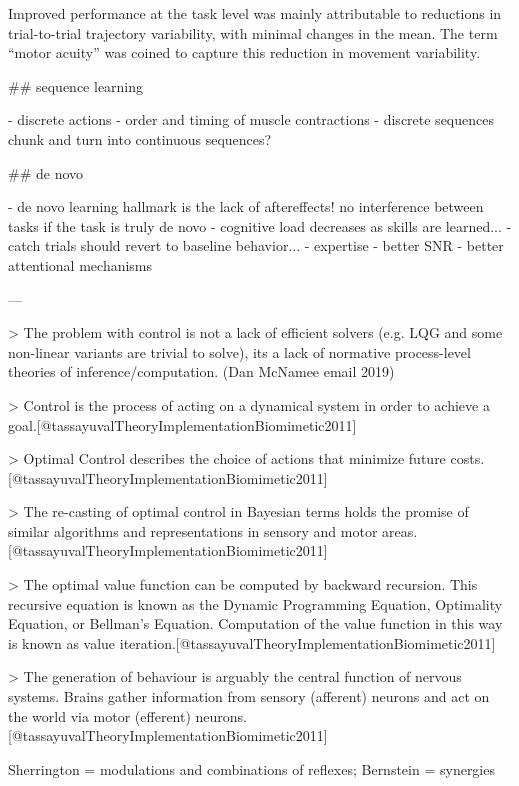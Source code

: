 \documentclass[../main.tex]{subfiles}
\begin{document}
{{Improved performance at the task level was mainly attributable to reductions in trial-to-trial trajectory variability, with minimal changes in the mean. The term “motor acuity” was coined to capture this reduction in movement variability.

## sequence learning

- discrete actions
- order and timing of muscle contractions
- discrete sequences chunk and turn into continuous sequences?

## de novo

- de novo learning hallmark is the lack of aftereffects! no interference between tasks if the task is truly de novo
- cognitive load decreases as skills are learned...
- catch trials should revert to baseline behavior...
- expertise
	- better SNR
	- better attentional mechanisms

---


> The problem with control is not a lack of efficient solvers (e.g. LQG and some non-linear variants are trivial to solve), its a lack of normative process-level theories of inference/computation. (Dan McNamee email 2019)

> Control is the process of acting on a dynamical system in order to achieve a goal.[@tassayuvalTheoryImplementationBiomimetic2011]


> Optimal Control describes the choice of actions that minimize future costs.[@tassayuvalTheoryImplementationBiomimetic2011]



> The re-casting  of  optimal  control  in  Bayesian  terms  holds  the  promise  of  similar algorithms and representations in sensory and motor areas.[@tassayuvalTheoryImplementationBiomimetic2011]



> The optimal value function can be computed by backward recursion. This recursive equation is known as the Dynamic Programming Equation, Optimality Equation, or Bellman's Equation. Computation of  the value function in this way is known as value iteration.[@tassayuvalTheoryImplementationBiomimetic2011]



> The generation of behaviour is arguably the central function of nervous systems. Brains gather information from sensory (afferent) neurons and act on the world via motor (efferent) neurons.[@tassayuvalTheoryImplementationBiomimetic2011]



Sherrington = modulations and combinations of reflexes;
Bernstein = synergies



}}
\end{document}

